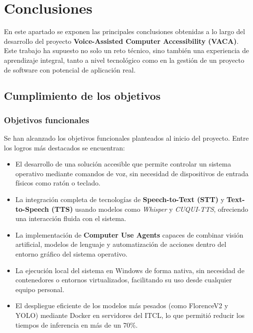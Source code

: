 
\section{Conclusiones}

En este apartado se exponen las principales conclusiones obtenidas a lo largo del desarrollo del proyecto \textbf{Voice-Assisted Computer Accessibility (VACA)}. Este trabajo ha supuesto no solo un reto técnico, sino también una experiencia de aprendizaje integral, tanto a nivel tecnológico como en la gestión de un proyecto de software con potencial de aplicación real.

\subsection{Cumplimiento de los objetivos}

\subsubsection{Objetivos funcionales}

Se han alcanzado los objetivos funcionales planteados al inicio del proyecto. Entre los logros más destacados se encuentran:

\begin{itemize}
    \item El desarrollo de una solución accesible que permite controlar un sistema operativo mediante comandos de voz, sin necesidad de dispositivos de entrada físicos como ratón o teclado.

    \item La integración completa de tecnologías de \textbf{Speech-to-Text (STT)} y \textbf{Text-to-Speech (TTS)} usando modelos como \textit{Whisper} y \textit{CUQUI-TTS}, ofreciendo una interacción fluida con el sistema.

    \item La implementación de \textbf{Computer Use Agents} capaces de combinar visión artificial, modelos de lenguaje y automatización de acciones dentro del entorno gráfico del sistema operativo.

    \item La ejecución local del sistema en Windows de forma nativa, sin necesidad de contenedores o entornos virtualizados, facilitando su uso desde cualquier equipo personal.

    \item El despliegue eficiente de los modelos más pesados (como FlorenceV2 y YOLO) mediante Docker en servidores del ITCL, lo que permitió reducir los tiempos de inferencia en más de un 70\%.
\end{itemize}

